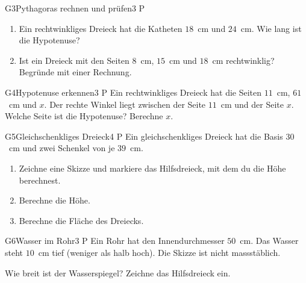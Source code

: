 \documentclass[11pt]{article}
\begin{document}
\begin{lpaufgabe}{G3}{Pythagoras rechnen und prüfen}{3 P}
\begin{enumerate}[label=(\alph*),leftmargin=*,itemsep=3pt]
\item Ein rechtwinkliges Dreieck hat die Katheten $18$~cm und $24$~cm. Wie lang ist die Hypotenuse?
\item Ist ein Dreieck mit den Seiten $8$~cm, $15$~cm und $18$~cm rechtwinklig? Begründe mit einer Rechnung.
\end{enumerate}
\end{lpaufgabe}

\begin{lpaufgabe}{G4}{Hypotenuse erkennen}{3 P}
Ein rechtwinkliges Dreieck hat die Seiten $11$~cm, $61$~cm und $x$. Der rechte Winkel liegt zwischen der Seite $11$~cm und der Seite $x$.
Welche Seite ist die Hypotenuse? Berechne $x$.
\end{lpaufgabe}


\begin{lpaufgabe}{G5}{Gleichschenkliges Dreieck}{4 P}
Ein gleichschenkliges Dreieck hat die Basis $30$~cm und zwei Schenkel von je $39$~cm.
\begin{enumerate}[label=(\alph*),leftmargin=*,itemsep=3pt]
\item Zeichne eine Skizze und markiere das Hilfsdreieck, mit dem du die Höhe berechnest.
\item Berechne die Höhe.
\item Berechne die Fläche des Dreiecks.
\end{enumerate}
\begin{center}\end{center}
\end{lpaufgabe}

\begin{lpaufgabe}{G6}{Wasser im Rohr}{3 P}
Ein Rohr hat den Innendurchmesser $50$~cm. Das Wasser steht $10$~cm tief (weniger als halb hoch). Die Skizze ist nicht massstäblich.
\begin{center}
\end{center}
Wie breit ist der Wasserspiegel? Zeichne das Hilfsdreieck ein.
\end{lpaufgabe}
\end{document}
